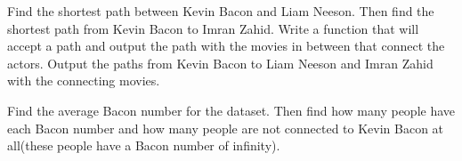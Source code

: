 \begin{problem}
Find the shortest path between Kevin Bacon and Liam Neeson. Then find the shortest path from Kevin Bacon to Imran Zahid. Write a function that will accept a path and output the path with the movies in between that connect the actors. Output the paths from Kevin Bacon to Liam Neeson and Imran Zahid with the connecting movies.
\end{problem}

\begin{problem}
Find the average Bacon number for the dataset. Then find how many people have each Bacon number and how many people are not connected to Kevin Bacon at all(these people have a Bacon number of infinity).
\end{problem}


